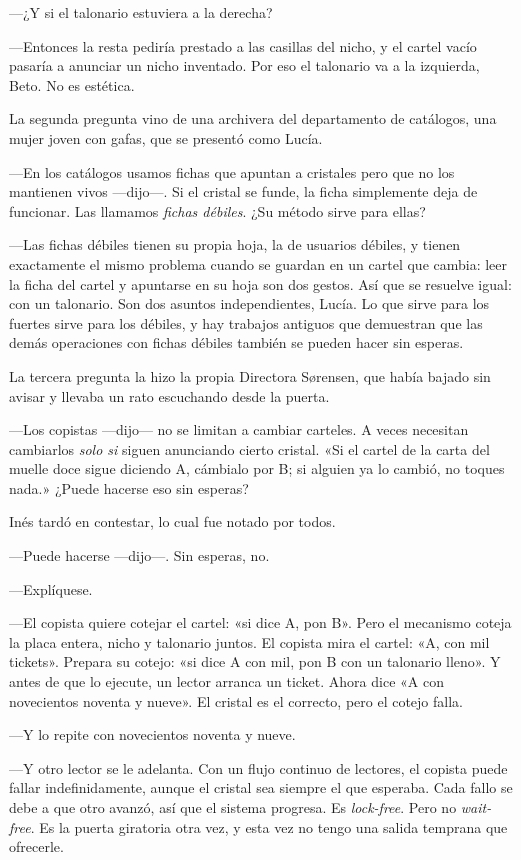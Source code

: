 ---¿Y si el talonario estuviera a la derecha?

---Entonces la resta pediría prestado a las casillas del nicho, y el cartel vacío pasaría a anunciar un nicho inventado. Por eso el talonario va a la izquierda, Beto. No es estética.

\escena
La segunda pregunta vino de una archivera del departamento de catálogos, una mujer joven con gafas, que se presentó como Lucía.

---En los catálogos usamos fichas que apuntan a cristales pero que no los mantienen vivos ---dijo---\nobreak. Si el cristal se funde, la ficha simplemente deja de funcionar. Las llamamos \emph{fichas débiles}. ¿Su método sirve para ellas?

---Las fichas débiles tienen su propia hoja, la de usuarios débiles, y tienen exactamente el mismo problema cuando se guardan en un cartel que cambia: leer la ficha del cartel y apuntarse en su hoja son dos gestos. Así que se resuelve igual: con un talonario. Son dos asuntos independientes, Lucía. Lo que sirve para los fuertes sirve para los débiles, y hay trabajos antiguos que demuestran que las demás operaciones con fichas débiles también se pueden hacer sin esperas.

\escena
La tercera pregunta la hizo la propia Directora Sørensen, que había bajado sin avisar y llevaba un rato escuchando desde la puerta.

---Los copistas ---dijo--- no se limitan a cambiar carteles. A veces necesitan cambiarlos \emph{solo si} siguen anunciando cierto cristal. «Si el cartel de la carta del muelle doce sigue diciendo A, cámbialo por B; si alguien ya lo cambió, no toques nada.» ¿Puede hacerse eso sin esperas?

Inés tardó en contestar, lo cual fue notado por todos.

---Puede hacerse ---dijo---\nobreak. Sin esperas, no.

---Explíquese.

---El copista quiere cotejar el cartel: «si dice A, pon B». Pero el mecanismo coteja la placa entera, nicho y talonario juntos. El copista mira el cartel: «A, con mil tickets». Prepara su cotejo: «si dice A con mil, pon B con un talonario lleno». Y antes de que lo ejecute, un lector arranca un ticket. Ahora dice «A con novecientos noventa y nueve». El cristal es el correcto, pero el cotejo falla.

---Y lo repite con novecientos noventa y nueve.

---Y otro lector se le adelanta. Con un flujo continuo de lectores, el copista puede fallar indefinidamente, aunque el cristal sea siempre el que esperaba. Cada fallo se debe a que otro avanzó, así que el sistema progresa. Es \emph{lock-free}. Pero no \emph{wait-free}. Es la puerta giratoria otra vez, y esta vez no tengo una salida temprana que ofrecerle.

